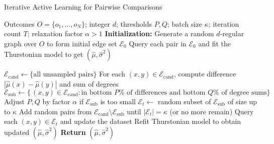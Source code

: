 \begin{algorithm}[t]
\caption{Iterative Active Learning for Pairwise Comparisons}
\label{alg:edge-sampling}
\begin{algorithmic}[1]
\REQUIRE Outcomes $O=\{o_1,\ldots,o_N\}$; integer $d$; thresholds $P,Q$; batch size $\kappa$; iteration count $T$; relaxation factor $\alpha>1$
\STATE \textbf{Initialization:}
\STATE Generate a random $d$-regular graph over $O$ to form initial edge set $\mathcal{E}_{0}$
\STATE Query each pair in $\mathcal{E}_{0}$ and fit the Thurstonian model to get $(\hat{\mu},\hat{\sigma}^2)$

  \STATE $\mathcal{E}_{\text{cand}} \leftarrow \{\text{all unsampled pairs}\}$
  \STATE For each $(x,y)\in\mathcal{E}_{\text{cand}}$, compute difference $|\hat{\mu}(x)-\hat{\mu}(y)|$ and sum of degrees
  \STATE $\mathcal{E}_{\text{sub}} \leftarrow \{\,(x,y)\in \mathcal{E}_{\text{cand}}: \text{in bottom }P\%\text{ of differences and bottom }Q\%\text{ of degree sums}\}$
  \STATE Adjust $P,Q$ by factor $\alpha$ if $\mathcal{E}_{\text{sub}}$ is too small
  \STATE $\mathcal{E}_{t} \leftarrow$ random subset of $\mathcal{E}_{\text{sub}}$ of size up to $\kappa$
    \STATE Add random pairs from $\mathcal{E}_{\text{cand}}\setminus \mathcal{E}_{\text{sub}}$ until $|\mathcal{E}_{t}| = \kappa$ (or no more remain)
  \ENDIF
  \STATE Query each $(x,y)\in \mathcal{E}_{t}$ and update the dataset
  \STATE Refit Thurstonian model to obtain updated $(\hat{\mu},\hat{\sigma}^2)$
\ENDFOR
\STATE \textbf{Return} $(\hat{\mu},\hat{\sigma}^2)$
\end{algorithmic}
\end{algorithm}